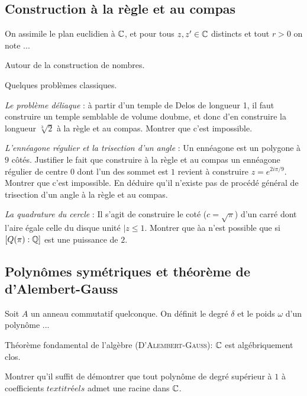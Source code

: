 \documentclass[french]{report}
\begin{document}
\subsection*{Construction à la règle et au compas}

On assimile le plan euclidien à \(\mathbb{C}\), et pour tous \(z,z'\in\mathbb{C}\) distincts
et tout \(r>0\) on note ...

\begin{exo}
    Autour de la construction de nombres.
\end{exo}

\begin{exo}
    Quelques problèmes classiques.
    \begin{q}{1}
        \textit{Le problème déliaque} : à partir d'un temple de Delos de longueur 1,
        il faut construire un temple semblable de volume doubme, et donc d'en construire
        la longueur \(\sqrt[3]{2}\) à la règle et au compas. Montrer que c'est impossible.
    \end{q}
    \begin{q}{2}
        \textit{L'ennéagone régulier et la trisection d'un angle} : Un ennéagone est un
        polygone à \(9\) côtés. Justifier le fait que construire à la règle et au
        compas un ennéagone régulier de centre \(0\) dont l'un des sommet est \(1\)
        revient à construire \(z=e^{2i\pi/9}\). Montrer que c'est impossible. En
        déduire qu'il n'existe pas de procédé général de trisection d'un angle à la règle
        et au compas.
    \end{q}
    \begin{q}{3}
        \textit{La quadrature du cercle} : Il s'agit de construire le coté
        (\(c=\sqrt{\pi}\)) d'un carré dont l'aire égale celle du disque unité \(|z\leq 1\).
        Montrer que àa n'est possible que si \([Q(\pi):\mathbb{Q}]\) est une puissance de \(2\).
    \end{q}
\end{exo}
\subsection*{Polynômes symétriques et théorème de d'Alembert-Gauss}

\begin{exo}
    Soit \(A\) un anneau commutatif quelconque. On définit le degré \(\delta\) et le
    poids \(\omega\) d'un polynôme ...
\end{exo}

\begin{exo}
    Théorème fondamental de l'algèbre (\textsc{D'Alembert-Gauss}): \(\mathbb{C}\) est
    algébriquement clos.
    \begin{q}{1}
        Montrer qu'il suffit de démontrer que tout polynôme de degré supérieur à \(1\)
        à coefficients \(textit{réels}\) admet une racine dans \(\mathbb{C}\).
    \end{q}
\end{exo}
\end{document}
